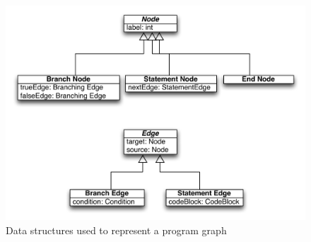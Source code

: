 \begin{figure}[h]
	\centering
	\includegraphics[scale=1.0]{../img/program_graph}
	\caption{Data structures used to represent a program graph}
	\label{fig:programgraph}
\end{figure}

